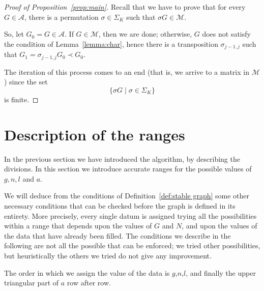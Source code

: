 \documentclass{amsart}
\theoremstyle{plain}
\theoremstyle{definition}
\newtheorem{notation}[theorem]{Notation}
\DeclareMathOperator{\MAX}{max}
\begin{document}
\begin{proof}[Proof of Proposition~\ref{prop:main}]
  Recall that we have to prove that for every $G \in \mathcal{A}$,
  there is a permutation $\sigma \in \Sigma_K$ such that $\sigma G \in
  \mathcal{M}$.

  So, let $G_0 = G \in \mathcal{A}$. If $G \in \mathcal{M}$, then we
  are done; otherwise, $G$ does not satisfy the condition of
  Lemma~\ref{lemma:char}, hence there is a transposition $\sigma_{j-1,
    j}$ such that $G_1 = \sigma_{j-1,j} G_0 \prec G_0$.

  The iteration of this process comes to an end (that is, we arrive to
  a matrix in $\mathcal{M}$) since the set
  \[
  \bigl\{ \sigma G \mid \sigma \in \Sigma_K\bigr\}
  \]
  is finite.
\end{proof}



\section{Description of the ranges}\label{sec:ranges}

In the previous section we have introduced the algorithm, by
describing the divisions. In this section we introduce accurate ranges
for the possible values of $g, n, l$ and $a$.

We will deduce from the conditions of Definition~\ref{def:stable
  graph} some other necessary conditions that can be checked before
the graph is defined in its entirety. More precisely, every single
datum is assigned trying all the possibilities within a range that
depends upon the values of $G$ and $N$, and upon the values of the
data that have already been filled. The conditions we describe in the
following are not all the possible that can be enforced; we tried
other possibilities, but heuristically the others we tried do not give
any improvement.

The order in which we assign the value of the data is $g$,$n$,$l$, and
finally the upper triangular part of $a$ row after row.

\end{document}
